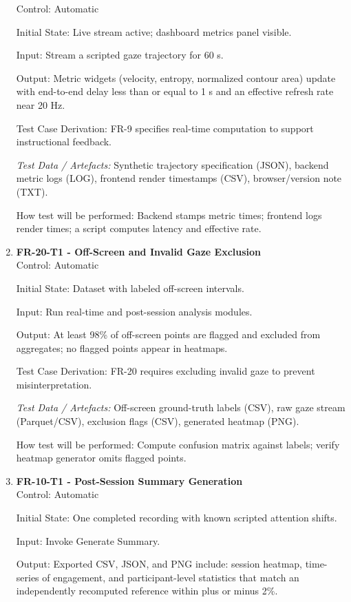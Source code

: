 \documentclass[12pt, titlepage]{article}
\begin{document}
\begin{enumerate}
Control: Automatic

Initial State: Live stream active; dashboard metrics panel visible.

Input: Stream a scripted gaze trajectory for 60 s.

Output: Metric widgets (velocity, entropy, normalized contour area) update with end-to-end delay less than or equal to 1 s and an effective refresh rate near 20 Hz.

Test Case Derivation: FR-9 specifies real-time computation to support instructional feedback.

\textit{Test Data / Artefacts:} Synthetic trajectory specification (JSON), backend metric logs (LOG), frontend render timestamps (CSV), browser/version note (TXT).

How test will be performed: Backend stamps metric times; frontend logs render times; a script computes latency and effective rate.

\item \textbf{FR-20-T1 - Off-Screen and Invalid Gaze Exclusion} \\

Control: Automatic

Initial State: Dataset with labeled off-screen intervals.

Input: Run real-time and post-session analysis modules.

Output: At least 98\% of off-screen points are flagged and excluded from aggregates; no flagged points appear in heatmaps.

Test Case Derivation: FR-20 requires excluding invalid gaze to prevent misinterpretation.

\textit{Test Data / Artefacts:} Off-screen ground-truth labels (CSV), raw gaze stream (Parquet/CSV), exclusion flags (CSV), generated heatmap (PNG).

How test will be performed: Compute confusion matrix against labels; verify heatmap generator omits flagged points.

\item \textbf{FR-10-T1 - Post-Session Summary Generation} \\

Control: Automatic

Initial State: One completed recording with known scripted attention shifts.

Input: Invoke Generate Summary.

Output: Exported CSV, JSON, and PNG include: session heatmap, time-series of engagement, and participant-level statistics that match an independently recomputed reference within plus or minus 2\%.


\end{enumerate}
\end{document}
